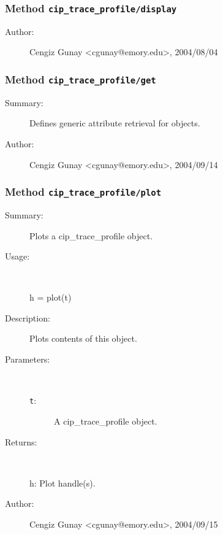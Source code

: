 \subsubsection[Method \texttt{display}]{Method \texttt{cip\_trace\_profile/display}}%
%
\label{ref_cip_trace_profile__display}%
\hypertarget{ref_cip_trace_profile__display}{}%
\begin{description}
%
%
%
%
%
%
%
\item[Author:]%
Cengiz Gunay <cgunay@emory.edu>, 2004/08/04
%
\end{description}
\methodline%
\subsubsection[Method \texttt{get}]{Method \texttt{cip\_trace\_profile/get}}%
%
\label{ref_cip_trace_profile__get}%
\hypertarget{ref_cip_trace_profile__get}{}%
\begin{description}
\item[Summary:]Defines generic attribute retrieval for objects.
%
%
%
%
%
%
%
\item[Author:]%
Cengiz Gunay <cgunay@emory.edu>, 2004/09/14
%
\end{description}
\methodline%
\subsubsection[Method \texttt{plot}]{Method \texttt{cip\_trace\_profile/plot}}%
%
\label{ref_cip_trace_profile__plot}%
\hypertarget{ref_cip_trace_profile__plot}{}%
\begin{description}
\item[Summary:]Plots a cip\_trace\_profile object.
%
\item[Usage:]~%
\begin{lyxcode}%
h = plot(t)
%
\end{lyxcode}%
%
\item[Description:]%
Plots contents of this object.
\item[Parameters:]~
\begin{description}%
\item[\texttt{t}:]
 A cip\_trace\_profile object.
\end{description}%
%
\item[Returns:
]~

	h: Plot handle(s).
%
%
%
\item[Author:]%
Cengiz Gunay <cgunay@emory.edu>, 2004/09/15
%
\end{description}
\methodline%
